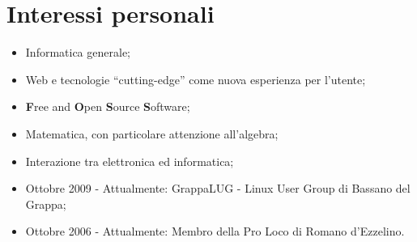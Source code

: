 \documentclass[pdftex, a4paper, 11pt]{article}
\begin{document}


\section*{Interessi personali}
\begin{itemize}
\item Informatica generale;
\item Web e tecnologie ``cutting-edge'' come nuova esperienza per l'utente;
\item {\bf F}ree and {\bf O}pen {\bf S}ource {\bf S}oftware;
\item Matematica, con particolare attenzione all'algebra;
\item Interazione tra elettronica ed informatica;
\item Ottobre 2009 - Attualmente: GrappaLUG - Linux User Group di Bassano del Grappa;
\item Ottobre 2006 - Attualmente: Membro della Pro Loco di Romano d'Ezzelino.
\end{itemize}
\end{document}
